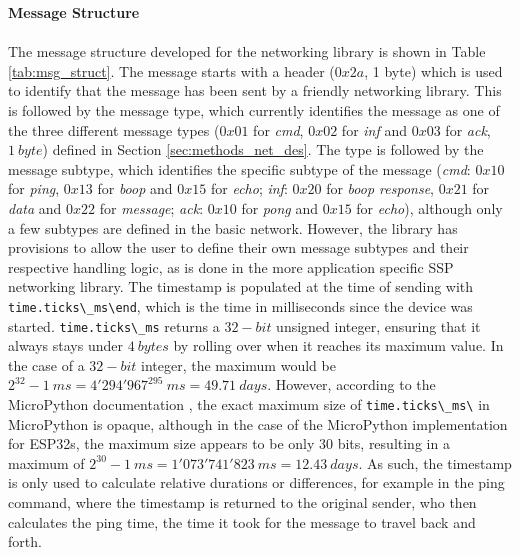 \textbf{\label{sec:methods_msg_struct}Message Structure}\\\\
The message structure developed for the networking library is shown in Table \ref{tab:msg_struct}. The message starts with a header ($0x2a$, 1 byte) which is used to identify that the message has been sent by a friendly networking library. 
This is followed by the message type, which currently identifies the message as one of the three different message types ($0x01$ for \textit{cmd}, $0x02$ for \textit{inf} and $0x03$ for \textit{ack}, $1\ byte$) defined in Section \ref{sec:methods_net_des}. 
The type is followed by the message subtype, which identifies the specific subtype of the message (\textit{cmd}: $0x10$ for \textit{ping}, $0x13$ for \textit{boop} and $0x15$ for \textit{echo}; \textit{inf}: $0x20$ for \textit{boop response}, $0x21$ for \textit{data} and $0x22$ for \textit{message}; \textit{ack}: $0x10$ for \textit{pong} and $0x15$ for \textit{echo}), although only a few subtypes are defined in the basic network. However, the library has provisions to allow the user to define their own message subtypes and their respective handling logic, as is done in the more application specific SSP networking library.
The timestamp is populated at the time of sending with \verb!time.ticks\_ms\end!, which is the time in milliseconds since the device was started. \verb!time.ticks\_ms! returns a $32-bit$ unsigned integer, ensuring that it always stays under $4\ bytes$ by rolling over when it reaches its maximum value. In the case of a $32-bit$ integer, the maximum would be $2^{32} -1\ ms = 4'294'967^295\ ms = 49.71\ days$. However, according to the MicroPython documentation \citep{micropython_micropython_2025-1}, the exact maximum size of \verb!time.ticks\_ms\! in MicroPython is opaque, although in the case of the MicroPython implementation for ESP32s, the maximum size appears to be only 30 bits, resulting in a maximum of $2^{30}-1\ ms=1'073'741'823\ ms = 12.43\ days$.
As such, the timestamp is only used to calculate relative durations or differences, for example in the ping command, where the timestamp is returned to the original sender, who then calculates the ping time, the time it took for the message to travel back and forth.
